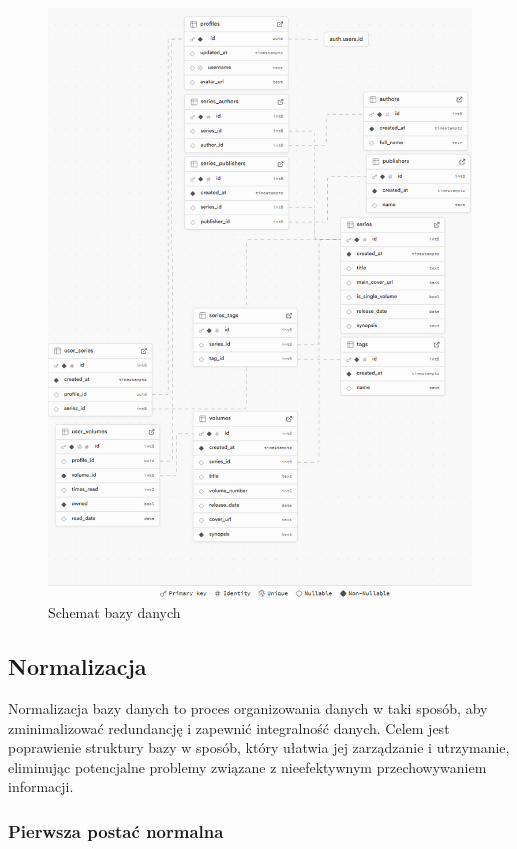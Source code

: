 \documentclass[12pt,twoside]{article}
\begin{document}
\begin{figure}[ht]
	\centering
	\includegraphics[width=1\textwidth]{figures/schemat1.png}
	\caption{Schemat bazy danych}
\label{Fig:schemat}
\end{figure}

\clearpage

\subsection{Normalizacja}

Normalizacja bazy danych to proces organizowania danych w taki sposób, aby zminimalizować redundancję i zapewnić 
integralność danych. Celem jest poprawienie struktury bazy w sposób, który ułatwia jej zarządzanie i utrzymanie, 
eliminując potencjalne problemy związane z nieefektywnym przechowywaniem informacji.

\subsubsection{Pierwsza postać normalna}
\end{document}
